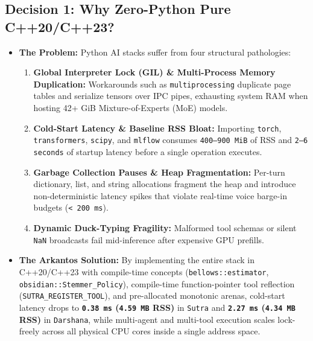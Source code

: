 \documentclass[11pt,a4paper]{article}
\begin{document}
\subsection{Decision 1: Why Zero-Python Pure C++20/C++23?}
\begin{itemize}[leftmargin=1.5em]
  \item \textbf{The Problem:} Python AI stacks suffer from four structural pathologies:
  \begin{enumerate}
    \item \textbf{Global Interpreter Lock (GIL) \& Multi-Process Memory Duplication:} Workarounds such as \texttt{multiprocessing} duplicate page tables and serialize tensors over IPC pipes, exhausting system RAM when hosting 42+ GiB Mixture-of-Experts (MoE) models.
    \item \textbf{Cold-Start Latency \& Baseline RSS Bloat:} Importing \texttt{torch}, \texttt{transformers}, \texttt{scipy}, and \texttt{mlflow} consumes \texttt{400--900 MiB} of RSS and \texttt{2--6 seconds} of startup latency before a single operation executes.
    \item \textbf{Garbage Collection Pauses \& Heap Fragmentation:} Per-turn dictionary, list, and string allocations fragment the heap and introduce non-deterministic latency spikes that violate real-time voice barge-in budgets (\texttt{< 200 ms}).
    \item \textbf{Dynamic Duck-Typing Fragility:} Malformed tool schemas or silent \texttt{NaN} broadcasts fail mid-inference after expensive GPU prefills.
  \end{enumerate}
  \item \textbf{The Arkantos Solution:} By implementing the entire stack in C++20/C++23 with compile-time concepts (\texttt{bellows::estimator}, \texttt{obsidian::Stemmer\_Policy}), compile-time function-pointer tool reflection (\texttt{SUTRA\_REGISTER\_TOOL}), and pre-allocated monotonic arenas, cold-start latency drops to \textbf{\texttt{0.38 ms} (\texttt{4.59 MB} RSS)} in \texttt{Sutra} and \textbf{\texttt{2.27 ms} (\texttt{4.34 MB} RSS)} in \texttt{Darshana}, while multi-agent and multi-tool execution scales lock-freely across all physical CPU cores inside a single address space.
\end{itemize}
\end{document}

